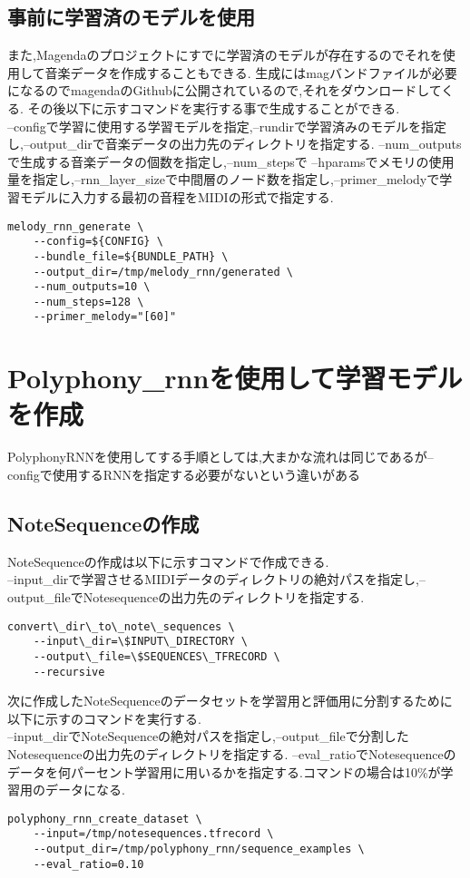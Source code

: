 \subsection{事前に学習済のモデルを使用}
また,Magendaのプロジェクトにすでに学習済のモデルが存在するのでそれを使用して音楽データを作成することもできる.
生成にはmagバンドファイルが必要になるのでmagendaのGithubに公開されているので,それをダウンロードしてくる.
その後以下に示すコマンドを実行する事で生成することができる.\\
--configで学習に使用する学習モデルを指定,--rundirで学習済みのモデルを指定し,--output\_dirで音楽データの出力先のディレクトリを指定する.
--num\_outputsで生成する音楽データの個数を指定し,--num\_stepsで
--hparamsでメモリの使用量を指定し,--rnn\_layer\_sizeで中間層のノード数を指定し,--primer\_melodyで学習モデルに入力する最初の音程をMIDIの形式で指定する.\\
\begin{lstlisting}[basicstyle=\ttfamily\footnotesize,frame=single]
    melody_rnn_generate \
    --config=${CONFIG} \
    --bundle_file=${BUNDLE_PATH} \
    --output_dir=/tmp/melody_rnn/generated \
    --num_outputs=10 \
    --num_steps=128 \
    --primer_melody="[60]"
\end{lstlisting}
\newpage
\section{Polyphony\_rnnを使用して学習モデルを作成}
PolyphonyRNNを使用してする手順としては,大まかな流れは同じであるが--configで使用するRNNを指定する必要がないという違いがある
\subsection{NoteSequenceの作成}
NoteSequenceの作成は以下に示すコマンドで作成できる.\\
--input\_dirで学習させるMIDIデータのディレクトリの絶対パスを指定し,--output\_fileでNotesequenceの出力先のディレクトリを指定する.\\
\begin{lstlisting}[basicstyle=\ttfamily\footnotesize,frame=single]
    convert\_dir\_to\_note\_sequences \
    --input\_dir=\$INPUT\_DIRECTORY \
    --output\_file=\$SEQUENCES\_TFRECORD \
    --recursive
\end{lstlisting}
次に作成したNoteSequenceのデータセットを学習用と評価用に分割するために以下に示すのコマンドを実行する.\\
--input\_dirでNoteSequenceの絶対パスを指定し,--output\_fileで分割したNotesequenceの出力先のディレクトリを指定する.
--eval\_ratioでNotesequenceのデータを何パーセント学習用に用いるかを指定する.コマンドの場合は10\%が学習用のデータになる.
\begin{lstlisting}[basicstyle=\ttfamily\footnotesize,frame=single]
    polyphony_rnn_create_dataset \
    --input=/tmp/notesequences.tfrecord \
    --output_dir=/tmp/polyphony_rnn/sequence_examples \
    --eval_ratio=0.10
    \end{lstlisting}
